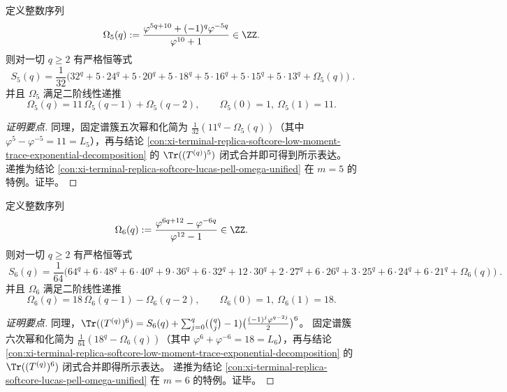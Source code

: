 \begin{conclusion}\label{con:xi-terminal-replica-softcore-exceptional-power-sum-m5}
定义整数序列
\[
\Omega_5(q):=\frac{\varphi^{5q+10}+(-1)^q\varphi^{-5q}}{\varphi^{10}+1}\in\ZZ.
\]
则对一切 \(q\ge 2\) 有严格恒等式
\[
\boxed{\;
S_5(q)=\frac1{32}\Big(32^{q}+5\cdot 24^{q}+5\cdot 20^{q}+5\cdot 18^{q}+5\cdot 16^{q}+5\cdot 15^{q}+5\cdot 13^{q}+\Omega_5(q)\Big)\; }.
\]
并且 \(\Omega_5\) 满足二阶线性递推
\[
\Omega_5(q)=11\,\Omega_5(q-1)+\Omega_5(q-2),\qquad \Omega_5(0)=1,\ \Omega_5(1)=11.
\]
\end{conclusion}
\begin{proof}[证明要点]
同理，固定谱簇五次幂和化简为 \(\frac1{32}(11^q-\Omega_5(q))\)（其中 \(\varphi^5-\varphi^{-5}=11=L_5\)），再与结论 \ref{con:xi-terminal-replica-softcore-low-moment-trace-exponential-decomposition} 的 \(\Tr((T^{(q)})^5)\) 闭式合并即可得到所示表达。
递推为结论 \ref{con:xi-terminal-replica-softcore-lucas-pell-omega-unified} 在 \(m=5\) 的特例。证毕。
\end{proof}

\begin{conclusion}\label{con:xi-terminal-replica-softcore-exceptional-power-sum-m6}
定义整数序列
\[
\Omega_6(q):=\frac{\varphi^{6q+12}-\varphi^{-6q}}{\varphi^{12}-1}\in\ZZ.
\]
则对一切 \(q\ge 2\) 有严格恒等式
\[
\boxed{\;
S_6(q)=\frac1{64}\Big(
64^{q}+6\cdot48^{q}+6\cdot40^{q}+9\cdot36^{q}+6\cdot32^{q}+12\cdot30^{q}
+2\cdot27^{q}+6\cdot26^{q}+3\cdot25^{q}+6\cdot24^{q}+6\cdot21^{q}+\Omega_6(q)\Big)\; } .
\]
并且 \(\Omega_6\) 满足二阶线性递推
\[
\Omega_6(q)=18\,\Omega_6(q-1)-\Omega_6(q-2),\qquad \Omega_6(0)=1,\ \Omega_6(1)=18.
\]
\end{conclusion}
\begin{proof}[证明要点]
同理，\(
\Tr((T^{(q)})^6)=S_6(q)+\sum_{j=0}^{q}(\binom{q}{j}-1)\bigl(\frac{(-1)^j\varphi^{q-2j}}{2}\bigr)^6
\)。
固定谱簇六次幂和化简为 \(\frac1{64}(18^q-\Omega_6(q))\)（其中 \(\varphi^6+\varphi^{-6}=18=L_6\)），再与结论 \ref{con:xi-terminal-replica-softcore-low-moment-trace-exponential-decomposition} 的 \(\Tr((T^{(q)})^6)\) 闭式合并即得所示表达。
递推为结论 \ref{con:xi-terminal-replica-softcore-lucas-pell-omega-unified} 在 \(m=6\) 的特例。证毕。
\end{proof}

